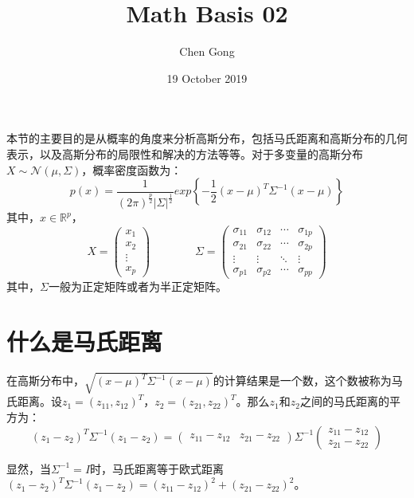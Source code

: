 \documentclass[a4paper]{article}
\title{Math Basis 02}
\author{Chen Gong}
\date{19 October 2019}
\begin{document}
\maketitle
本节的主要目的是从概率的角度来分析高斯分布，包括马氏距离和高斯分布的几何表示，以及高斯分布的局限性和解决的方法等等。对于多变量的高斯分布$X\sim \mathcal{N}(\mu,\Sigma)$，概率密度函数为：
\begin{equation}
    p(x)=\frac{1}{(2\pi)^{\frac{p}{2}}|\Sigma|^{\frac{1}{2}}}exp\left\{ -\frac{1}{2}(x-\mu)^T\Sigma^{-1}(x-\mu) \right\}
\end{equation}
其中，$x\in\mathbb{R}^p$，
\begin{equation}
    X=
    \begin{pmatrix}
        x_1 \\
        x_2 \\
        \vdots \\
        x_p
    \end{pmatrix} \qquad \qquad
    \Sigma = 
    \begin{pmatrix}
        \sigma_{11} & \sigma_{12} & \cdots & \sigma_{1p} \\
        \sigma_{21} & \sigma_{22} & \cdots & \sigma_{2p} \\
        \vdots      & \vdots      & \ddots & \vdots      \\
        \sigma_{p1} & \sigma_{p2} & \cdots & \sigma_{pp}
        \end{pmatrix}
\end{equation}
其中，$\Sigma$一般为正定矩阵或者为半正定矩阵。

\section{什么是马氏距离}
在高斯分布中，$\sqrt{(x-\mu)^T\Sigma^{-1}(x-\mu)}$的计算结果是一个数，这个数被称为马氏距离。设$z_1=(z_{11}, z_{12})^T$，$z_2=(z_{21}, z_{22})^T$。那么$z_1$和$z_2$之间的马氏距离的平方为：
\begin{equation}
    (z_1-z_2)^T\Sigma^{-1}(z_1-z_2)=
    \begin{pmatrix}
        z_{11}-z_{12} & z_{21}-z_{22}
    \end{pmatrix}
    \Sigma^{-1}
    \begin{pmatrix}
        z_{11}-z_{12} \\
        z_{21}-z_{22}
    \end{pmatrix}
\end{equation}

显然，当$\Sigma^{-1}=I$时，马氏距离等于欧式距离$ (z_1-z_2)^T\Sigma^{-1}(z_1-z_2)=(z_{11}-z_{12})^2+(z_{21}-z_{22})^2$。
\end{document}
